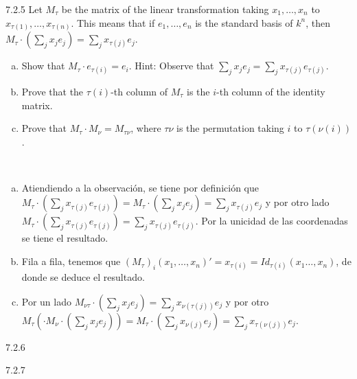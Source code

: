 \documentclass[twoside]{article}
\begin{document}
\begin{ejercicio}{7.2.5}
Let $M_{τ}$ be the matrix of the linear transformation taking $x_1,\dots , x_n$ to $x_{τ(1)},\dots , x_{τ(n)}$.
This means that if $e_1, \dots, e_n$ is the standard basis of $k^n$, then $M_τ \cdot(\sum_j x_je_j) =\sum_j x_{τ(j)}e_j$.
\begin{enumerate}[a.]
\item Show that $M_τ \cdot e_{τ(i)} = e_i$. Hint: Observe that
$\sum_j x_je_j =\sum_j x_{τ(j)}e_{τ(j)}$.
\item Prove that the $τ(i)$-th column of $M_τ$ is the $i$-th column of the identity matrix.
\item Prove that $M_τ \cdot M_ν = M_{τν}$, where $τν$ is the permutation taking $i$ to $τ(ν(i))$.
\end{enumerate}

\end{ejercicio}
\begin{solucion}\
\begin{enumerate}[a.]
\item Atiendiendo a la observación, se tiene por definición que $M_τ \cdot(\sum_j x_{τ(j)}e_{τ(j)})=M_τ \cdot(
\sum_j x_je_j) =\sum_j x_{τ(j)}e_j$ y por otro lado $M_τ \cdot(\sum_j x_{τ(j)}e_{τ(j)})=\sum_j x_{τ(j)}e_{τ(j)}$. Por la unicidad de las coordenadas se tiene el resultado. 
\item Fila a fila, tenemos que $(M_τ)_i(x_1,\dots, x_n)'=x_{\tau(i)}=Id_{\tau(i)}(x_1\dots, x_n)$, de donde se deduce el resultado.  
\item Por un lado $M_{ντ}\cdot(\sum_j x_je_j) =\sum_j x_{\nu(τ(j))}e_j$ y por otro $M_τ (\cdot M_ν \cdot(\sum_j x_je_j))=M_τ \cdot(\sum_j x_{\nu(j)}e_j)=\sum_j x_{\tau(\nu(j))}e_j$.
\end{enumerate}
\end{solucion}
\newpage

\begin{ejercicio}{7.2.6}

\end{ejercicio}
\begin{solucion}

\end{solucion}
\newpage

\begin{ejercicio}{7.2.7}

\end{ejercicio}
\begin{solucion}

\end{solucion}
\newpage
\end{document}
